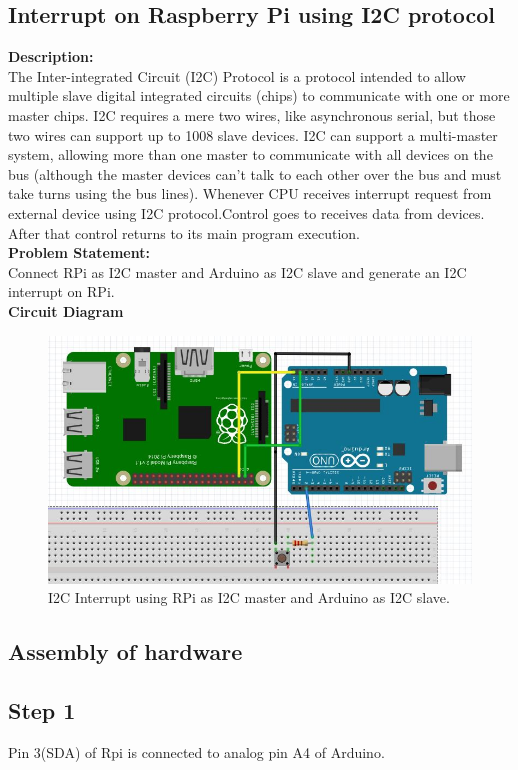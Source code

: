 \documentclass[a4paper,12pt,oneside]{book}
\begin{document}
\subsection*{Interrupt on Raspberry Pi using I2C protocol}
\textbf{Description:} \\
The Inter-integrated Circuit (I2C) Protocol is a protocol intended to allow multiple slave digital integrated circuits (chips) to communicate with one or more master chips. I2C requires a mere two wires, like asynchronous serial, but those two wires can support up to 1008 slave devices. I2C can support a multi-master system, allowing more than one master to communicate with all devices on the bus (although the master devices can't talk to each other over the bus and must take turns using the bus lines). Whenever CPU receives interrupt request from external device using I2C protocol.Control goes to receives data from devices. After that control returns to its main program execution.\\
\textbf{Problem Statement:} \\
Connect RPi as I2C master and Arduino as I2C slave and generate an I2C interrupt on RPi.\\
\newpage
\textbf{Circuit Diagram}  \\
\begin{figure}[H]
    \centering
    \includegraphics[scale = 0.6]{rpi_with_arduino}
    \caption{I2C Interrupt using RPi as I2C master and Arduino as I2C slave.}
\end{figure}
\subsection*{Assembly of hardware}
\subsection*{Step 1}
Pin 3(SDA) of Rpi is connected to analog pin A4 of Arduino.
\end{document}
